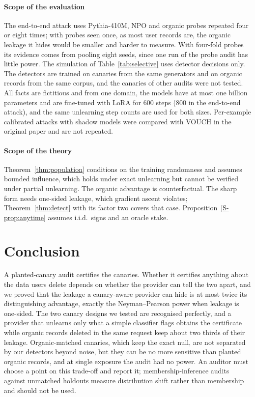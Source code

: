 \paragraph{Scope of the evaluation} The end-to-end attack uses Pythia-410M, NPO and organic
probes repeated four or eight times; with probes seen once, as most user records are, the
organic leakage it hides would be smaller and harder to measure. With four-fold probes its
evidence comes from pooling eight seeds, since one run of the probe audit has little power. The simulation of
Table~\ref{tab:selective} uses detector decisions only. The detectors are trained on canaries from
the same generators and on organic records from the same corpus, and the canaries of other
audits were not tested.
All facts are fictitious and from one domain, the models have at most one billion parameters
and are fine-tuned with LoRA for $600$ steps ($800$ in the end-to-end attack), and the same unlearning step counts are used for
both sizes. Per-example calibrated attacks with shadow models \citep{carlini2022lira} were
compared with VOUCH in the original paper and are not repeated.

\paragraph{Scope of the theory} Theorem~\ref{thm:population} conditions on the training
randomness and assumes bounded influence, which holds under exact unlearning but cannot be
verified under partial unlearning. The organic advantage is counterfactual. The sharp form
needs one-sided leakage, which gradient ascent violates; Theorem~\ref{thm:detect} with its
factor two covers that case. Proposition~\ref{S-prop:anytime} assumes i.i.d.\ signs and an
oracle stake.

\section{Conclusion}\label{sec:conclusion}

A planted-canary audit certifies the canaries. Whether it certifies anything about the data
users delete depends on whether the provider can tell the two apart, and we proved that the
leakage a canary-aware provider can hide is at most twice its distinguishing advantage, exactly
the Neyman--Pearson power when leakage is one-sided. The two canary designs we tested are
recognised perfectly, and a provider that unlearns only what a simple classifier flags obtains the
certificate while organic records deleted in the same request keep about two thirds of their
leakage. Organic-matched
canaries, which keep the exact null, are not separated by our detectors beyond noise, but they
can be no more sensitive than planted organic records, and at single exposure the audit had no
power. An auditor must
choose a point on this trade-off and report it; membership-inference audits against unmatched
holdouts measure distribution shift rather than membership and should not be used.
